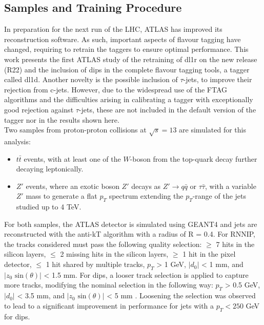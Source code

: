 \subsection{Samples and Training Procedure}
In preparation for the next run of the LHC, ATLAS has improved its reconstruction software. As such, important aspects of flavour tagging have changed, requiring to retrain the taggers to ensure optimal performance. This work presents the first ATLAS study of the retraining of \gls{dl1r} on the new release (R22) and the inclusion of \gls{dips} in the complete flavour tagging tools, a tagger called \gls{dl1d}. Another novelty is the possible inclusion of $\tau$-jets, to improve their rejection from c-jets. However, due to the widespread use of the FTAG algorithms and the difficulties arising in calibrating a tagger with exceptionally good rejection against $\tau$-jets, these are not included in the default version of the tagger nor in the results shown here.  \\ 

Two samples from proton-proton collisions at $\sqrt{s} = 13$ are simulated for this analysis:
\begin{itemize}
\item $t\bar{t}$ events, with at least one of the $W$-boson from the top-quark decay further decaying leptonically. 
\item $Z'$ events, where an exotic boson $Z'$ decays as $Z' \rightarrow q\bar{q} \textrm{ or } \tau \bar{\tau}$, with a variable $Z'$ mass to generate a flat $p_T$ spectrum extending the $p_T$-range of the jets studied up to 4 TeV.
\end{itemize}

For both samples, the ATLAS detector is simulated using GEANT4 \cite{Agostinelli:602040} and jets are reconstructed with the anti-kT algorithm with a radius of R = 0.4.  For RNNIP, the tracks considered must pass the following quality selection: $\geq$ 7 hits in the silicon layers, $\leq$ 2 missing hits in the silicon layers, $\geq$ 1 hit in the pixel detector, $\leq$ 1 hit shared by multiple tracks, $p_T$ > 1 GeV, $|d_0|$ < 1 mm, and $|z_0 \textrm{ sin}(\theta)|$ < 1.5 mm. For \gls{dips}, a looser track selection is applied to capture more tracks, modifying the nominal selection in the following way: $p_T$ > 0.5 GeV, $|d_0|$ < 3.5 mm, and $|z_0 \textrm{ sin}(\theta)|$ < 5 mm \cite{ATL-PHYS-PUB-2020-014}. Loosening the selection was observed to lead to a significant improvement in performance for jets with a $p_T < 250$ GeV for \gls{dips}. \\

